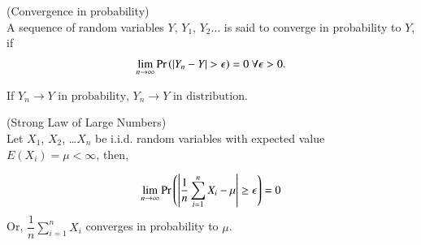 \documentclass[journal,12pt,twocolumn]{IEEEtran}
\begin{document}
\begin{definition}
    (Convergence in probability)\\
    A sequence of random variables $Y$, $Y_1$, $Y_2 \ldots$ is said to converge in probability to $Y$, if
    \begin{align}
        \lim_{n \to \infty}\Pr\left(\vert Y_n - Y\vert > \epsilon\right) = 0  \text{  }\forall \epsilon > 0.
    \end{align}
\end{definition}

\begin{lemma}\label{lma1}
    If
    \begin{math}
    {Y_n} \to Y \text{ in probability, }{Y_n} \to Y \text{ in distribution.}
    \end{math}
\end{lemma}


\begin{lemma}\label{lma3}
    (Strong Law of Large Numbers)\\ 
Let $X_1$, $X_2$, \ldots $X_n$ be i.i.d. random variables with expected value $E(X_i)=\mu < \infty$, then,

\begin{align}
    \lim_{n \to \infty}\Pr\left(\left|\dfrac{1}{n}\sum_{i=1}^n X_i - \mu \right|\geq \epsilon\right)=0
\end{align}
Or, 
\begin{math}
    \dfrac{1}{n}\sum_{i=1}^n X_i
\end{math}
converges in probability to $\mu$.
\end{lemma}
\end{document}
